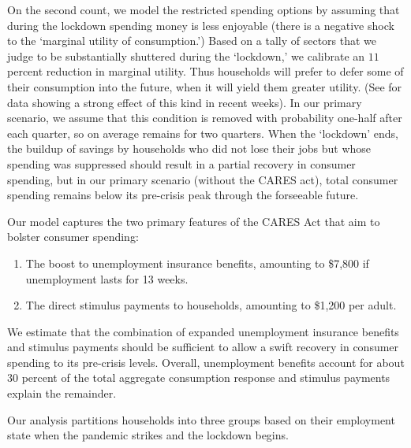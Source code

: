 On the second count, we model the restricted spending options by assuming that during the lockdown spending money is less enjoyable (there is a negative shock to the `marginal utility of consumption.')
Based on a tally of sectors that we judge to be substantially shuttered during the `lockdown,' we calibrate an $11$ percent reduction in marginal utility.
Thus households will prefer to defer some of their consumption into the future, when it will yield them greater utility. (See \cite{SpanishSpending} for data showing a strong effect of this kind in recent weeks).
In our primary scenario, we assume that this condition is removed with probability one-half after each quarter, so on average remains for two quarters.  When the `lockdown' ends, the buildup of savings by households who did not lose their jobs but whose spending was suppressed should result in a partial recovery in consumer spending, but in our primary scenario (without the CARES act), total consumer spending remains below its pre-crisis peak through the forseeable future.  %

Our model captures the two primary features of the CARES Act that aim to bolster consumer spending:
\begin{enumerate}
\item The boost to unemployment insurance benefits, amounting to \$7,800 if unemployment lasts for 13 weeks.
\item The direct stimulus payments to households, amounting to \$1,200 per adult.
\end{enumerate}

We estimate that the combination of expanded unemployment insurance benefits and stimulus payments should be sufficient to allow a swift recovery in consumer spending to its pre-crisis levels.
Overall, unemployment benefits account for about 30 percent of the total aggregate consumption response and stimulus payments explain the remainder.

Our analysis partitions households into three groups based on their employment state when the pandemic strikes and the lockdown begins.

